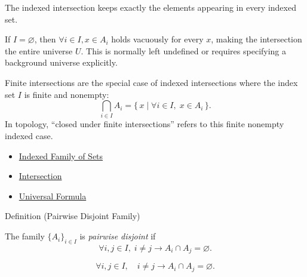 \begin{remark*}[Interpretation]
The indexed intersection keeps exactly the elements appearing in every indexed
set.
\end{remark*}

\begin{remark*}[Exposition]
If $I = \varnothing$, then $\forall i \in I, x \in A_i$ holds vacuously for
every $x$, making the intersection the entire universe $U$. This is normally
left undefined or requires specifying a background universe explicitly.
\end{remark*}

\begin{remark*}[Exposition]
Finite intersections are the special case of indexed intersections where the
index set $I$ is finite and nonempty:
\[
\bigcap_{i\in I}A_i
=
\{\,x\mid \forall i\in I,\; x\in A_i\,\}.
\]
In topology, ``closed under finite intersections'' refers to this finite
nonempty indexed case.
\end{remark*}


\begin{dependencies}
\begin{itemize}
  \item \hyperref[def:indexed-family]{Indexed Family of Sets}
  \item \hyperref[def:intersection]{Intersection}
  \item \hyperref[def:universal-q]{Universal Formula}
\end{itemize}
\end{dependencies}

\begin{definitionbox}{Definition (Pairwise Disjoint Family)}
\begin{definition}\label{def:pairwise-disjoint}
The family $\{A_i\}_{i \in I}$ is \emph{pairwise disjoint} if
\[
\forall i,j \in I,\;
i \neq j \rightarrow A_i \cap A_j = \varnothing.
\]
\end{definition}
\end{definitionbox}

\begin{remark*}
\[
  \forall i,j\in I,\quad
  i\neq j\to A_i\cap A_j=\varnothing.
\]
\end{remark*}


